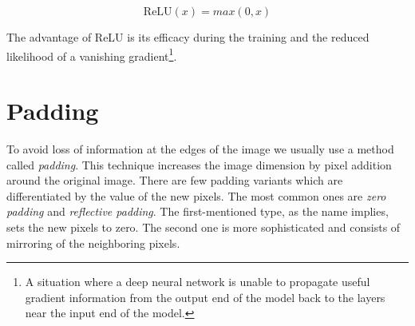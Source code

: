 \begin{equation}
    \label{eq:relu}
    \mathrm{ReLU}(x) = max(0,x)
\end{equation}

The advantage of ReLU is its efficacy during the training and the reduced likelihood of a vanishing
gradient\footnote{\label{foot:vangrad}A situation where a deep neural network is unable to propagate useful gradient
information from the output end of the model back to the layers near the input end of the model.}.

\section{Padding}\label{sec:padding}
To avoid loss of information at the edges of the image we usually use a method called \textit{padding}.
This technique increases the image dimension by pixel addition around the original image.
There are few padding variants which are differentiated by the value of the new pixels.
The most common ones are \textit{zero padding} and \textit{reflective padding}.
The first-mentioned type, as the name implies, sets the new pixels to zero.
The second one is more sophisticated and consists of mirroring of the neighboring pixels.

